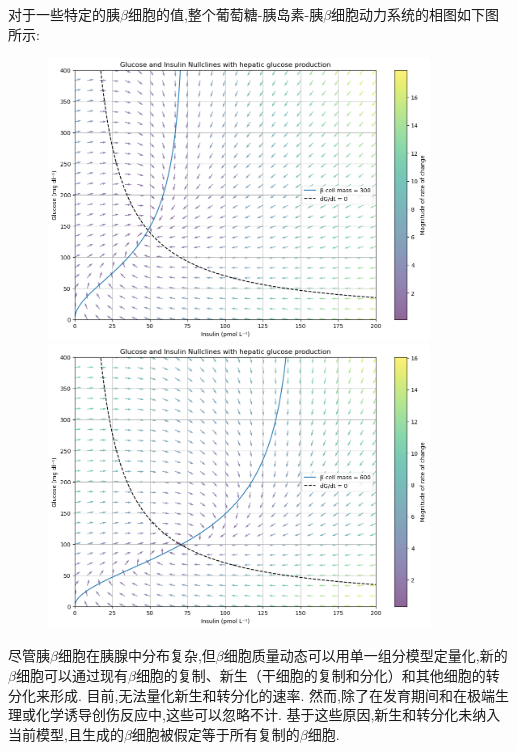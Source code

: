 对于一些特定的胰$\beta$细胞的值,整个葡萄糖-胰岛素-胰$\beta$细胞动力系统的相图如下图所示:
\begin{figure}[H]
    \begin{minipage}[t]{0.5\textwidth}
        \centering
        \includegraphics[width=0.9\textwidth]{Img/phase_300.png}
    \end{minipage}
    \begin{minipage}[t]{0.5\textwidth}
        \centering
        \includegraphics[width=0.9\textwidth]{Img/phase_600.png}
    \end{minipage}
    \label{fig:phase}
\end{figure}

尽管胰$\beta$细胞在胰腺中分布复杂,但$\beta$细胞质量动态可以用单一组分模型定量化,新的$\beta$细胞可以通过现有$\beta$细胞的复制、新生（干细胞的复制和分化）和其他细胞的转分化来形成. 目前,无法量化新生和转分化的速率. 然而,除了在发育期间和在极端生理或化学诱导创伤反应中,这些可以忽略不计\cite{finegood1995dynamics}. 基于这些原因,新生和转分化未纳入当前模型,且生成的$\beta$细胞被假定等于所有复制的$\beta$细胞. 

